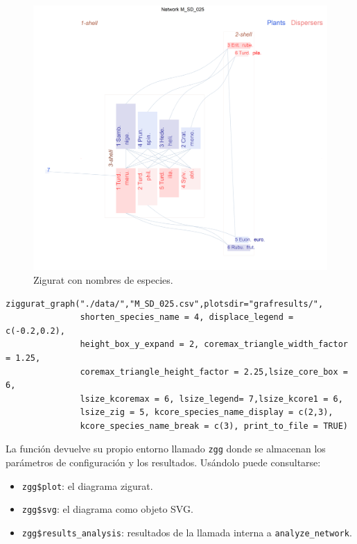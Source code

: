 \begin{figure}[hp!]
\centering
\includegraphics[scale=0.48]{ManFigs/M_SD_025_ziggurat.png}
\caption {Zigurat con nombres de especies.}
\label{fig:AKMAN_ziggurat_025}
\end{figure}

\fontsize{3.5mm}{3.5mm}\selectfont
\begin{verbatim}
ziggurat_graph("./data/","M_SD_025.csv",plotsdir="grafresults/",
               shorten_species_name = 4, displace_legend = c(-0.2,0.2),
               height_box_y_expand = 2, coremax_triangle_width_factor = 1.25,
               coremax_triangle_height_factor = 2.25,lsize_core_box = 6,
               lsize_kcoremax = 6, lsize_legend= 7,lsize_kcore1 = 6, 
               lsize_zig = 5, kcore_species_name_display = c(2,3), 
               kcore_species_name_break = c(3), print_to_file = TRUE)
\end{verbatim}
\normalsize

\clearpage
\noindent La función devuelve su propio entorno llamado \texttt{zgg} donde se almacenan los parámetros de configuración y los resultados. Usándolo puede consultarse:

\begin{itemize}

\item \texttt{zgg\$plot}:  el diagrama zigurat.

\item \texttt{zgg\$svg}: el diagrama como objeto SVG.

\item \texttt{zgg\$results\_analysis}: resultados de la llamada interna a \texttt{analyze\_network}.

\end{itemize}
 

